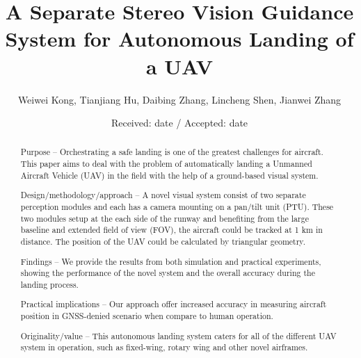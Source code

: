 \title{A Separate Stereo Vision Guidance System for Autonomous Landing of a UAV}


\author{Weiwei Kong, Tianjiang Hu, Daibing Zhang, Lincheng Shen, Jianwei Zhang %
}



\date{Received: date / Accepted: date}


\maketitle

\begin{abstract}
Purpose – Orchestrating a safe landing is one of the greatest challenges for aircraft. This paper aims to deal with the problem of automatically landing a Unmanned Aircraft Vehicle (UAV) in the field with the help of a ground-based visual system.

Design/methodology/approach – A novel visual system consist of two separate perception modules and each has a camera mounting on a pan/tilt unit (PTU). These two modules setup at the each side of the runway and benefiting from the large baseline and extended field of view (FOV), the aircraft could be tracked at 1 km in distance. The position of the UAV could be calculated by triangular geometry.

Findings – We provide the results from both simulation and practical experiments, showing the performance of the novel system and the overall accuracy during the landing process. 

Practical implications – Our approach offer increased accuracy in measuring aircraft position in GNSS-denied scenario when compare to human operation. 

Originality/value – This autonomous landing system caters for all of the different UAV system in operation, such as fixed-wing, rotary wing and other novel airframes. 


\end{abstract}

